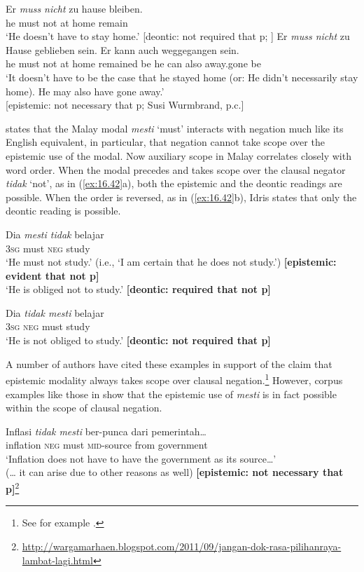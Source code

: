 \ea \label{ex:16.41}
\ea   \gll Er  \textit{muss  nicht}  zu  hause  bleiben.\\
he  must  not  at  home  remain\\
\glt ‘He doesn’t have to stay home.’   [deontic: not required that p; \citet{vonFintel2006}]
\ex \gll Er  \textit{muss  nicht}  zu  Hause  geblieben  sein.  Er  kann  auch  weggegangen  sein.\\
he  must  not  at  home  remained  be  he  can  also  away.gone  be\\
\glt ‘It doesn’t have to be the case that he stayed home (or: He didn’t necessarily stay home). He may also have gone away.’\\
{}[epistemic: not necessary that p; Susi Wurmbrand, p.c.]
\z \z


\citet{Idris1980} states that the Malay modal \textit{mesti} ‘must’ interacts with negation much like its English equivalent, in particular, that negation cannot take scope over the epistemic use of the modal. Now auxiliary scope in Malay correlates closely with word order. When the modal precedes and takes scope over the clausal negator \textit{tidak} ‘not’, as in (\ref{ex:16.42}a), both the epistemic and the deontic readings are possible. When the order is reversed, as in (\ref{ex:16.42}b), Idris states that only the deontic reading is possible.


\ea \label{ex:16.42}
\ea  \gll Dia  \textit{mesti  tidak}  belajar\\
\textsc{3sg}  must  \textsc{neg}  study\\
\glt ‘He must not study.’ (i.e., ‘I am certain that he does not study.’)        \textbf{[epistemic: evident that not p]}\\
‘He is obliged not to study.’  \textbf{[deontic: required that not p]}

\ex \gll Dia  \textit{tidak  mesti}  belajar\\
\textsc{3sg}  \textsc{neg}  must  study\\
\glt ‘He is not obliged to study.’  \textbf{[deontic: not required that p]}
\z \z


A number of authors have cited these examples in support of the claim that epistemic modality always takes scope over clausal negation.\footnote{See for example \citet{deHaan1997,Drubig2001}.} However, corpus examples like those in  show that the epistemic use of \textit{mesti} is in fact possible within the scope of clausal negation.


\ea \label{ex:16.43}
\ea  \gll Inflasi  \textit{tidak  mesti}  ber-punca  dari  pemerintah…\\
inflation  \textsc{neg}  must  \textsc{mid}-source  from  government\\
\glt ‘Inflation does not have to have the government as its source…’\\
(… it can arise due to other reasons as well)      \textbf{[epistemic: not necessary that p]}\footnote{\url{http://wargamarhaen.blogspot.com/2011/09/jangan-dok-rasa-pilihanraya-lambat-lagi.html}}

